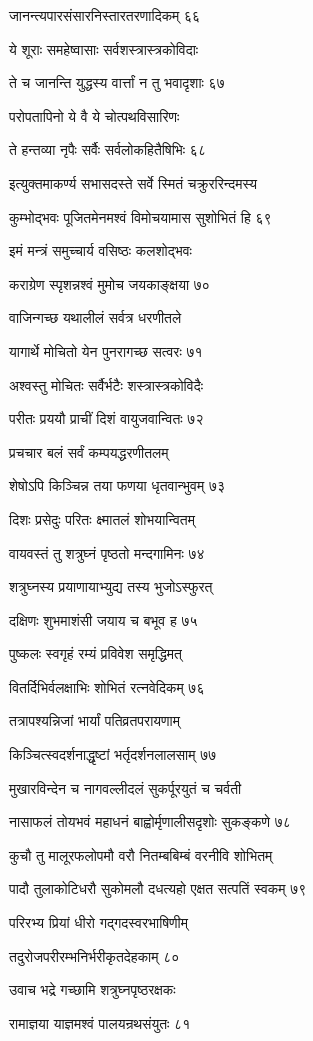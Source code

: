 जानन्त्यपारसंसारनिस्तारतरणादिकम् ६६

ये शूराः समहेष्वासाः सर्वशस्त्रास्त्रकोविदाः

ते च जानन्ति युद्धस्य वार्त्तां न तु भवादृशाः ६७

परोपतापिनो ये वै ये चोत्पथविसारिणः

ते हन्तव्या नृपैः सर्वैः सर्वलोकहितैषिभिः ६८

इत्युक्तमाकर्ण्य सभासदस्ते सर्वे स्मितं चक्रुररिन्दमस्य

कुम्भोद्भवः पूजितमेनमश्वं विमोचयामास सुशोभितं हि ६९

इमं मन्त्रं समुच्चार्य वसिष्ठः कलशोद्भवः

कराग्रेण स्पृशन्नश्वं मुमोच जयकाङ्क्षया ७०

वाजिन्गच्छ यथालीलं सर्वत्र धरणीतले

यागार्थे मोचितो येन पुनरागच्छ सत्वरः ७१

अश्वस्तु मोचितः सर्वैर्भटैः शस्त्रास्त्रकोविदैः

परीतः प्रययौ प्राचीं दिशं वायुजवान्वितः ७२

प्रचचार बलं सर्वं कम्पयद्धरणीतलम्

शेषोऽपि किञ्चिन्न तया फणया धृतवान्भुवम् ७३

दिशः प्रसेदुः परितः क्ष्मातलं शोभयान्वितम्

वायवस्तं तु शत्रुघ्नं पृष्ठतो मन्दगामिनः ७४

शत्रुघ्नस्य प्रयाणायाभ्युद्य तस्य भुजोऽस्फुरत्

दक्षिणः शुभमाशंसी जयाय च बभूव ह ७५

पुष्कलः स्वगृहं रम्यं प्रविवेश समृद्धिमत्

वितर्दिभिर्वलक्षाभिः शोभितं रत्नवेदिकम् ७६

तत्रापश्यन्निजां भार्यां पतिव्रतपरायणाम्

किञ्चित्स्वदर्शनाद्धृष्टां भर्तृदर्शनलालसाम् ७७

मुखारविन्देन च नागवल्लीदलं सुकर्पूरयुतं च चर्वती

नासाफलं तोयभवं महाधनं बाह्वोर्मृणालीसदृशोः सुकङ्कणे ७८

कुचौ तु मालूरफलोपमौ वरौ नितम्बबिम्बं वरनीवि शोभितम्

पादौ तुलाकोटिधरौ सुकोमलौ दधत्यहो एक्षत सत्पतिं स्वकम् ७९

परिरभ्य प्रियां धीरो गद्गदस्वरभाषिणीम्

तदुरोजपरीरम्भनिर्भरीकृतदेहकाम् ८०

उवाच भद्रे गच्छामि शत्रुघ्नपृष्ठरक्षकः

रामाज्ञया याज्ञमश्वं पालयन्रथसंयुतः ८१

